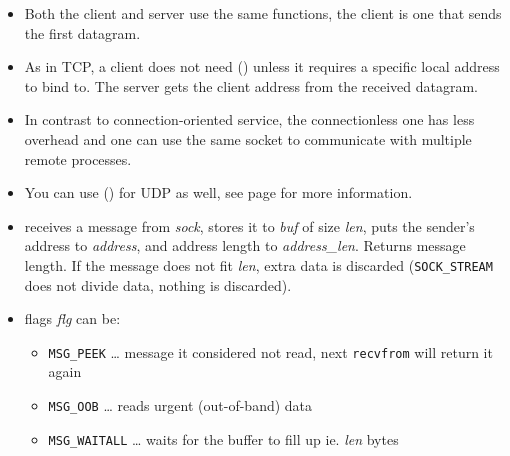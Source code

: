 \begin{slide}

\end{slide}

\begin{itemize}
\item Both the client and server use the same functions, the client is one that
sends the first datagram.
\item As in TCP, a client does not need () unless it requires a
specific local address to bind to.  The server gets the client address from the
received datagram.
\item In contrast to connection-oriented service, the connectionless one has
less overhead and one can use the same socket to communicate with multiple
remote processes.
\item You can use () for UDP as well, see page
\pageref{CONNECT_FOR_UDP} for more information.
\end{itemize}



\begin{slide}
\setlength{\baselineskip}{0.8\baselineskip}
\begin{itemize}
\item receives a message from \emph{sock}, stores it to \emph{buf}
of size \emph{l{}en}, puts the sender's address to \emph{address},
and address length to \emph{address\_len}.  Returns message length.
If the message does not fit \emph{l{}en}, extra data is discarded
(\texttt{SOCK\_STREAM} does not divide data, nothing is discarded).
\item flags \emph{flg} can be:
    \begin{itemize}
    \item \texttt{MSG\_PEEK} \dots{} message it considered not read, next
    \texttt{recvfrom} will return it again
    \item \texttt{MSG\_OOB} \dots{} reads urgent (out-of-band)
    data 
    \item \texttt{MSG\_WAITALL} \dots{} waits for the buffer to fill up
    ie. \emph{l{}en} bytes
    \end{itemize}
\end{itemize}
\end{slide}

